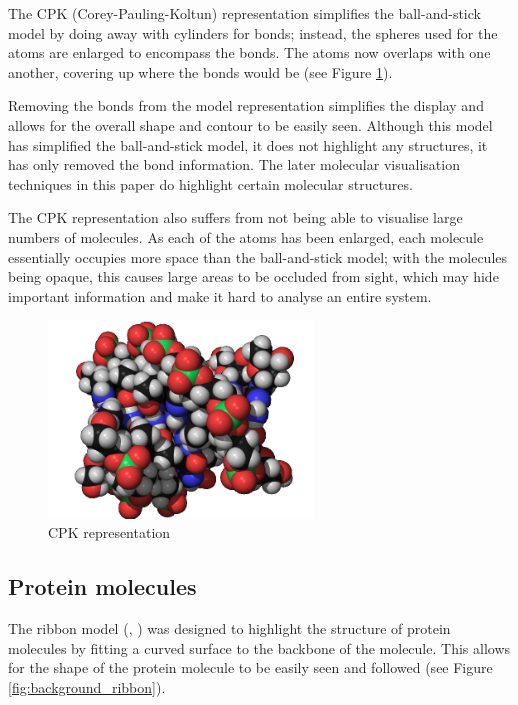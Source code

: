 The CPK (Corey-Pauling-Koltun) \citep{corey53} representation simplifies the
ball-and-stick model by doing away with cylinders for bonds; instead, the
spheres used for the atoms are enlarged to encompass the bonds. The atoms now
overlaps with one another, covering up where the bonds would be (see Figure
\ref{fig:background_cpk}).

Removing the bonds from the model representation simplifies the display and
allows for the overall shape and contour to be easily seen. Although this model
has simplified the ball-and-stick model, it does not highlight any structures,
it has only removed the bond information. The later molecular visualisation
techniques in this paper do highlight certain molecular structures.

The CPK representation also suffers from not being able to visualise large
numbers of molecules. As each of the atoms has been enlarged, each molecule
essentially occupies more space than the ball-and-stick model; with the
molecules being opaque, this causes large areas to be occluded from sight, which
may hide important information and make it hard to analyse an entire system.

\begin{figure}[h!]
  \begin{center}
    \includegraphics[width=70mm]{cpk}
  \end{center}
  \caption{CPK representation}
  \label{fig:background_cpk}
\end{figure}


\subsection{Protein molecules}
\label{sub:background_protein}

The ribbon model (\citep{richardson81}, \citep{carson87}) was designed to
highlight the structure of protein molecules by fitting a curved surface to the
backbone of the molecule. This allows for the shape of the protein molecule to
be easily seen and followed (see Figure \ref{fig:background_ribbon}).

